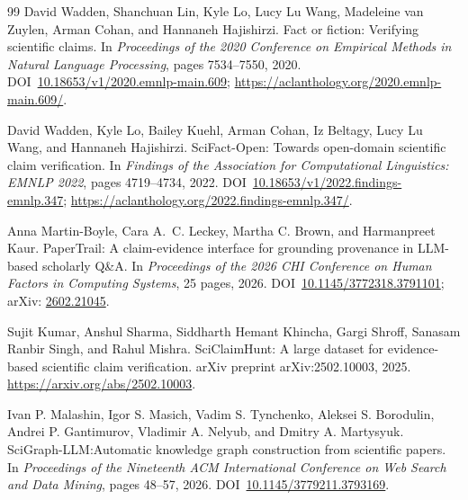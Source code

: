 \begin{thebibliography}{99}
David Wadden, Shanchuan Lin, Kyle Lo, Lucy Lu Wang, Madeleine van Zuylen, Arman Cohan, and Hannaneh Hajishirzi.
\newblock Fact or fiction: Verifying scientific claims.
\newblock In \emph{Proceedings of the 2020 Conference on Empirical Methods in Natural Language Processing}, pages 7534--7550, 2020.
\newblock DOI~\href{https://doi.org/10.18653/v1/2020.emnlp-main.609}{10.18653/v1/2020.emnlp-main.609}; \url{https://aclanthology.org/2020.emnlp-main.609/}.

David Wadden, Kyle Lo, Bailey Kuehl, Arman Cohan, Iz Beltagy, Lucy Lu Wang, and Hannaneh Hajishirzi.
\newblock SciFact-Open: Towards open-domain scientific claim verification.
\newblock In \emph{Findings of the Association for Computational Linguistics: EMNLP 2022}, pages 4719--4734, 2022.
\newblock DOI~\href{https://doi.org/10.18653/v1/2022.findings-emnlp.347}{10.18653/v1/2022.findings-emnlp.347}; \url{https://aclanthology.org/2022.findings-emnlp.347/}.

Anna Martin-Boyle, Cara A.~C. Leckey, Martha C. Brown, and Harmanpreet Kaur.
\newblock PaperTrail: A claim-evidence interface for grounding provenance in LLM-based scholarly Q\&A.
\newblock In \emph{Proceedings of the 2026 CHI Conference on Human Factors in Computing Systems}, 25 pages, 2026.
\newblock DOI~\href{https://doi.org/10.1145/3772318.3791101}{10.1145/3772318.3791101}; arXiv: \href{https://arxiv.org/abs/2602.21045}{2602.21045}.

Sujit Kumar, Anshul Sharma, Siddharth Hemant Khincha, Gargi Shroff, Sanasam Ranbir Singh, and Rahul Mishra.
\newblock SciClaimHunt: A large dataset for evidence-based scientific claim verification.
\newblock arXiv preprint arXiv:2502.10003, 2025.
\newblock \url{https://arxiv.org/abs/2502.10003}.

Ivan P. Malashin, Igor S. Masich, Vadim S. Tynchenko, Aleksei S. Borodulin, Andrei P. Gantimurov, Vladimir A. Nelyub, and Dmitry A. Martysyuk.
\newblock SciGraph-LLM:\@ Automatic knowledge graph construction from scientific papers.
\newblock In \emph{Proceedings of the Nineteenth ACM International Conference on Web Search and Data Mining}, pages 48--57, 2026.
\newblock DOI~\href{https://doi.org/10.1145/3779211.3793169}{10.1145/3779211.3793169}.

\end{thebibliography}